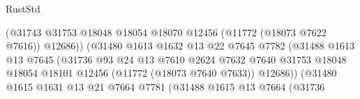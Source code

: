\begin{lexlean}{RustStd}
\begin{coremodule}
                                                (@31743
                                                  @31753
                                                  @18048
                                                  @18054
                                                  @18070
                                                  @12456
                                                  (@11772 (@18073 @7622 @7616))
                                                  @12686))
                                              (@31480
                                                @1613
                                                @1632
                                                @13
                                                @22
                                                @7645
                                                @7782
                                                (@31488
                                                  @1613
                                                  @13
                                                  @7645
                                                  (@31736
                                                    @93
                                                    @24
                                                    @13
                                                    @7610
                                                    @2624
                                                    @7632
                                                    @7640
                                                    @31753
                                                    @18048
                                                    @18054
                                                    @18101
                                                    @12456
                                                    (@11772 (@18073 @7640 @7633))
                                                    @12686))
                                                (@31480
                                                  @1615
                                                  @1631
                                                  @13
                                                  @21
                                                  @7664
                                                  @7781
                                                  (@31488
                                                    @1615
                                                    @13
                                                    @7664
                                                    (@31736

\end{coremodule}
\end{lexlean}

